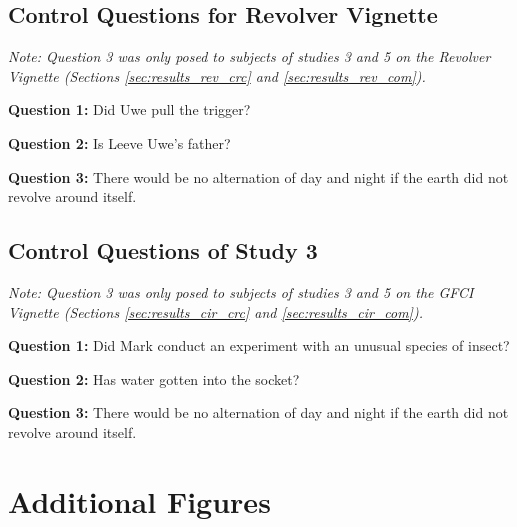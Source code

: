 \documentclass[egregdoesnotlikesansseriftitles,12pt]{scrartcl}
\begin{document}
\subsection{Control Questions for Revolver Vignette}\label{app:main_revolver_control}
\noindent\textit{Note: Question 3 was only posed to subjects of studies 3 and 5 on the Revolver Vignette (Sections \ref{sec:results_rev_crc} and \ref{sec:results_rev_com}).}

\vspace{1ex}
\noindent\textbf{Question 1:} Did Uwe pull the trigger?%

\vspace{1ex}
\noindent\textbf{Question 2:} Is Leeve Uwe's father?%

\vspace{1ex}
\noindent\textbf{Question 3:} There would be no alternation of day and night if the earth did not revolve around itself.%

\subsection{Control Questions of Study 3}\label{app:main_circuit_control}
\noindent\textit{Note: Question 3 was only posed to subjects of studies 3 and 5 on the GFCI Vignette (Sections \ref{sec:results_cir_crc} and \ref{sec:results_cir_com}).}

\vspace{1ex}
\noindent\textbf{Question 1:} Did Mark conduct an experiment with an unusual species of insect?%

\vspace{1ex}
\noindent\textbf{Question 2:} Has water gotten into the socket?%

\vspace{1ex}
\noindent\textbf{Question 3:} There would be no alternation of day and night if the earth did not revolve around itself.%

\clearpage
\section{Additional Figures}\label{app:additional_figures}
\end{document}
